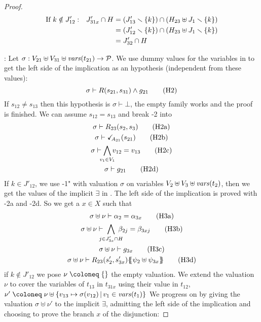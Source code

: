 \documentclass{article}
\begin{document}
\begin{proof}
\begin{align*}
		\text{If } k \notin J'_{12}: && J'_{31x} \cap H & = {\left(J'_{13} \smallsetminus {\left\{k\right\}}\right)} \cap {\left(H_{23} \uplus J_1 \smallsetminus{\left\{k\right\}}\right)} \\
		&&& = {\left(J'_{12} \smallsetminus {\left\{k\right\}}\right)} \cap {\left(H_{23} \uplus J_1 \smallsetminus{\left\{k\right\}}\right)} \\
		&&& = J'_{32} \cap H
	\end{align*}
\item[\goal{2}:] Let \(\sigma: V_{21} \uplus V_{31} \uplus \mathit{vars}{\left(t_{21}\right)} \to \mathcal{P}\).
	We use dummy values for the variables in  to get the left side of the implication as an hypothesis (independent from these values):
	\[ \sigma \vdash R\mpar{s_{21}, s_{31}} \wedge g_{21} \hyp{2} \]
	If \(s_{12} \neq s_{13}\) then this hypothesis is \(\sigma \vdash \bot\), the empty family works and the proof is finished.
	We can assume \(s_{12} = s_{13}\) and break \hyp{2} into
	\begin{gather}
		\sigma \vdash R_{23}\mpar{s_2, s_3} \hyp{2a} \\
		\sigma \vdash \reach{A_{21}}\mpar{s_{21}} \hyp{2b} \\
		\sigma \vdash \bigwedge_\subbox{v_1 \in V_1} v_{12} = v_{13} \hyp{2c} \\
		\sigma \vdash g_{21} \hyp{2d}
	\end{gather}
	If \(k \in J'_{12}\), we use \hyp{1"} with valuation \(\sigma\) on variables \(V_2 \uplus V_3 \uplus \mathit{vars}{\left(t_2\right)}\), then we get the values of the implicit \(\exists\) in .
	The left side of the implication is proved with \hyp{2a} and \hyp{2d}.
	So we get a \(x \in X\) such that
	\begin{gather}
		\sigma \uplus \nu \vdash \alpha_2 = \alpha_{3x} \hyp{3a} \\
		\sigma \uplus \nu \vdash \bigwedge_\subbox{j \in J'_{3x} \cap H} \beta_{2j} = \beta_{3xj} \hyp{3b} \\
		\sigma \uplus \nu \vdash g_{3x} \hyp{3c} \\
		\sigma \uplus \nu \vdash R_{23}\mpar{s'_2, s'_{3x}}\psubst{\psi_2 \uplus \psi_{3x}} \hyp{3d}
	\end{gather}
	if \(k \notin J'_{12}\) we pose \(\nu \defobject \mbrc{}\) the empty valuation.
	We extend the valuation \(\nu\) to cover the variables of \(t_{13}\) in \(t_{31x}\) using their value in \(t_{12}\), \(\nu' \defobject \nu \uplus \mset{v_{13} \mapsto \sigma\mpar{v_{12}}}{v_1 \in \fvars{t_1}}\)
	We progress on  by giving the valuation \(\sigma \uplus \nu'\) to the implicit \(\exists\), admitting the left side of the implication and choosing to prove the branch \(x\) of the disjunction:

\end{proof}
\end{document}
